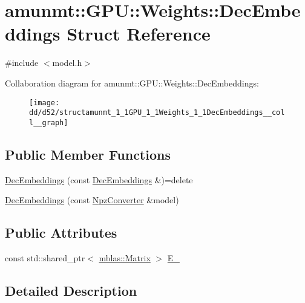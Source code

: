 \hypertarget{structamunmt_1_1GPU_1_1Weights_1_1DecEmbeddings}{}\section{amunmt\+:\+:G\+PU\+:\+:Weights\+:\+:Dec\+Embeddings Struct Reference}
\label{structamunmt_1_1GPU_1_1Weights_1_1DecEmbeddings}


{\ttfamily \#include $<$model.\+h$>$}



Collaboration diagram for amunmt\+:\+:G\+PU\+:\+:Weights\+:\+:Dec\+Embeddings\+:
\nopagebreak
\begin{figure}[H]
\begin{center}
\leavevmode
\texttt{[image: dd/d52/structamunmt\_1\_1GPU\_1\_1Weights\_1\_1DecEmbeddings\_\_coll\_\_graph]}
\end{center}
\end{figure}
\subsection*{Public Member Functions}
\begin{DoxyCompactItemize}
\item 
\hyperlink{structamunmt_1_1GPU_1_1Weights_1_1DecEmbeddings_a86badfe37964f548f5265e93e6b38628}{Dec\+Embeddings} (const \hyperlink{structamunmt_1_1GPU_1_1Weights_1_1DecEmbeddings}{Dec\+Embeddings} \&)=delete
\item 
\hyperlink{structamunmt_1_1GPU_1_1Weights_1_1DecEmbeddings_a3628f64b014e8738a40f4c7abf2f7462}{Dec\+Embeddings} (const \hyperlink{classamunmt_1_1GPU_1_1NpzConverter}{Npz\+Converter} \&model)
\end{DoxyCompactItemize}
\subsection*{Public Attributes}
\begin{DoxyCompactItemize}
\item 
const std\+::shared\+\_\+ptr$<$ \hyperlink{namespaceamunmt_1_1GPU_1_1mblas_ab67821a8254de53e45a623cf73c0aef6}{mblas\+::\+Matrix} $>$ \hyperlink{structamunmt_1_1GPU_1_1Weights_1_1DecEmbeddings_a947d12f7b900692a2cb55e2dbd3e53bd}{E\+\_\+}
\end{DoxyCompactItemize}


\subsection{Detailed Description}


